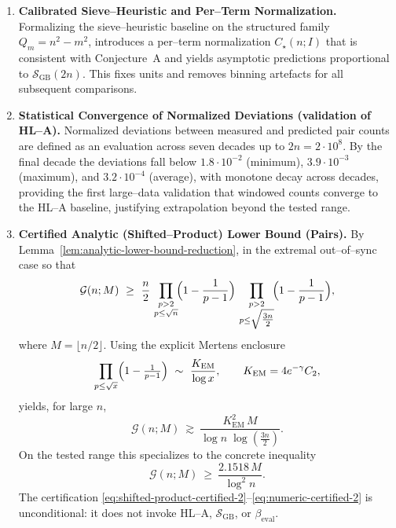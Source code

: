 \documentclass[11pt]{article}
\theoremstyle{inline}
\theoremstyle{break}
\theoremstyle{break}
\theoremstyle{break}
\theoremstyle{break}
\theoremstyle{break}
\theoremstyle{break}
\theoremstyle{break}
\theoremstyle{inline}
\newcommand{\xLambdaMinLimit}{1.8\cdot 10^{-2}} %
\newcommand{\xLambdaMaxLimit}{3.9\cdot 10^{-3}} %
\newcommand{\xLambdaAvgLimit}{3.2\cdot 10^{-4}} %
\newcommand{\SGB}{\mathcal{S}_{\scriptscriptstyle\mathrm{GB}}}
\newcommand{\betacal}{\beta_{\mathrm{eval}}}
\newcommand{\Kem}{K_{\mathrm{EM}}}              %
\begin{document}
\begin{enumerate}
  \item \textbf{Calibrated Sieve–Heuristic and Per–Term Normalization.}
  Formalizing the sieve–heuristic baseline on the structured family \(Q_m=n^2-m^2\), introduces a per–term normalization \( C_\star(n;I) \) that is consistent with Conjecture~A and yields asymptotic predictions proportional to \( \SGB(2n) \). This fixes units and removes binning artefacts for all subsequent comparisons.

  \item \textbf{Statistical Convergence of Normalized Deviations (validation of HL–A).}
  Normalized deviations between measured and predicted pair counts are defined as an evaluation across seven decades up to \(2n=2\cdot 10^8\). By the final decade the deviations fall below
  \( \xLambdaMinLimit \) (minimum), \( \xLambdaMaxLimit \) (maximum), and \( \xLambdaAvgLimit \) (average), with monotone decay across decades, providing the first large–data validation that windowed counts converge to the HL–A baseline, justifying extrapolation beyond the tested range.

  \item \textbf{Certified Analytic (Shifted–Product) Lower Bound (Pairs).}
  By Lemma~\ref{lem:analytic-lower-bound-reduction}, in the extremal out–of–sync case so that
  \begin{equation}\label{eq:shifted-product-certified-2}
    \mathcal{G}(n;M)\ \ge\ \frac{n}{2}\,
    \prod_{\substack{p>2\\ p\le \sqrt{n}}}\!\Bigl(1-\frac{1}{p-1}\Bigr)\,
    \prod_{\substack{p>2\\ p\le \sqrt{\tfrac{3n}{2}}}}\!\Bigl(1-\frac{1}{p-1}\Bigr),
  \end{equation}
  where \( M=\lfloor n/2\rfloor \). Using the explicit Mertens enclosure
  \cite{RosserSchoenfeld1962, Dusart2010, HardyLittlewood1923, MontgomeryVaughan2007}
  \begin{equation}\label{eq:mertens-enclosure-2}
    \prod_{p\le \sqrt{x}}\Bigl(1-\tfrac{1}{p-1}\Bigr)\ \sim\ \frac{\Kem}{\log x},
    \qquad \Kem=4e^{-\gamma}C_2,
  \end{equation}
  yields, for large \(n\),
  \begin{equation}\label{eq:asymp-certified-2}
    \mathcal{G}(n;M)\ \gtrsim\ \frac{\Kem^2\,M}{\log n\;\log(\tfrac{3n}{2})}.
  \end{equation}
  On the tested range this specializes to the concrete inequality
  \begin{equation}\label{eq:numeric-certified-2}
    \mathcal{G}(n;M)\ \ge\ \frac{2.1518\,M}{\log^2 n}.
  \end{equation}
  The certification \eqref{eq:shifted-product-certified-2}–\eqref{eq:numeric-certified-2} is unconditional: it does not invoke HL–A, \( \SGB \), or \( \betacal \).


\end{enumerate}
\end{document}
